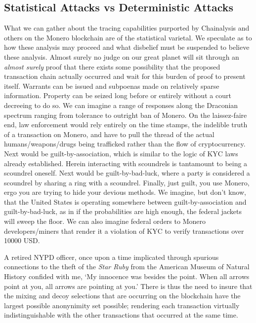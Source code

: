 \subsection{Statistical Attacks vs Deterministic Attacks}
What we can gather about the tracing capabilities purported by Chainalysis and others on the Monero blockchain are of the statistical varietal.  
We speculate as to how these analysis may proceed and what disbelief must be suspended to believe these analysis.  
Almost surely no judge on our great planet will sit through an \textit{almost surely} proof that there exists some possibility that the proposed transaction chain actually occurred and wait for this burden of proof to present itself.
Warrants can be issued and subpoenas made on relatively sparse information.
Property can be seized long before or entirely without a court decreeing to do so.
We can imagine a range of responses along the Draconian spectrum ranging from tolerance to outright ban of Monero.  
On the laissez-faire end, law enforcement would rely entirely on the time stamps, the indelible truth of a transaction on Monero, and have to pull the thread of the actual humans/weapons/drugs being trafficked rather than the flow of cryptocurrency.  
Next would be guilt-by-association, which is similar to the logic of KYC laws already established.
Herein interacting with scoundrels is tantamount to being a scoundrel oneself.
Next would be guilt-by-bad-luck, where a party is considered a scoundrel by sharing a ring with a scoundrel.
Finally, just guilt, you use Monero, ergo you are trying to hide your devious methods.
We imagine, but don't know, that the United States is operating somewhere between guilt-by-association and guilt-by-bad-luck, as in if the probabilities are high enough, the federal jackets will sweep the floor.  
We can also imagine federal orders to Monero developers/miners that render it a violation of KYC to verify transactions over 10000 USD.  

A retired NYPD officer, once upon a time implicated through spurious connections to the theft of the \textit{Star Ruby} from the American Museum of Natural History confided with me, `My innocence was besides the point.  When all arrows point at you, all arrows are pointing at you.'  
There is thus the need to insure that the mixing and decoy selections that are occurring on the blockchain have the largest possible anonynimity set possible; rendering each transaction virtually indistinguishable with the other transactions that occurred at the same time.


